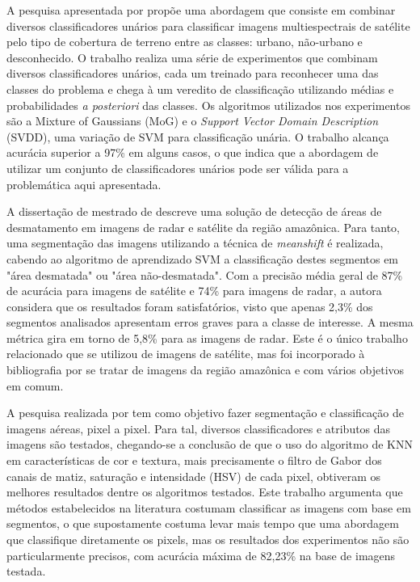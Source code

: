 A pesquisa apresentada por  propõe uma abordagem que consiste em combinar diversos classificadores unários para classificar imagens multiespectrais de satélite pelo tipo de cobertura de terreno entre as classes: urbano, não-urbano e desconhecido. O trabalho realiza uma série de experimentos que combinam diversos classificadores unários, cada um treinado para reconhecer uma das classes do problema e chega à um veredito de classificação utilizando médias e probabilidades \textit{a posteriori} das classes. Os algoritmos utilizados nos experimentos são a Mixture of Gaussians (MoG) e o \textit{Support Vector Domain Description} (SVDD), uma variação de SVM para classificação unária. O trabalho alcança acurácia superior a 97\% em alguns casos, o que indica que a abordagem de utilizar um conjunto de classificadores unários pode ser válida para a problemática aqui apresentada.

A dissertação de mestrado de  descreve uma solução de detecção de áreas de desmatamento em imagens de radar e satélite da região amazônica. Para tanto, uma segmentação das imagens utilizando a técnica de \textit{meanshift} é realizada, cabendo ao algoritmo de aprendizado SVM a classificação destes segmentos em "área desmatada" ou "área não-desmatada". Com a precisão média geral de 87\% de acurácia para imagens de satélite e 74\% para imagens de radar, a autora considera que os resultados foram satisfatórios, visto que apenas 2,3\% dos segmentos analisados apresentam erros graves para a classe de interesse. A mesma métrica gira em torno de 5,8\% para as imagens de radar. Este é o único trabalho relacionado que se utilizou de imagens de satélite, mas foi incorporado à bibliografia por se tratar de imagens da região amazônica e com vários objetivos em comum.

A pesquisa realizada por  tem como objetivo fazer segmentação e classificação de imagens aéreas, pixel a pixel. Para tal, diversos classificadores e atributos das imagens são testados, chegando-se a conclusão de que o uso do algoritmo de KNN em características de cor e textura, mais precisamente o filtro de Gabor \cite{fogel:1989} dos canais de matiz, saturação e intensidade (HSV) de cada pixel, obtiveram os melhores resultados dentre os algoritmos testados. Este trabalho argumenta que métodos estabelecidos na literatura costumam classificar as imagens com base em segmentos, o que supostamente costuma levar mais tempo que uma abordagem que classifique diretamente os pixels, mas os resultados dos experimentos não são particularmente precisos, com acurácia máxima de 82,23\% na base de imagens testada.

